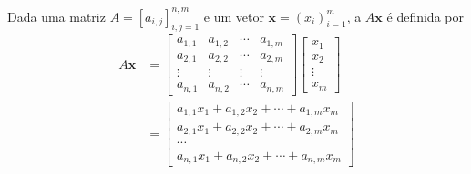 Dada uma matriz $A = [a_{i,j}]_{i,j=1}^{n,m}$ e um vetor $\pmb{x} = (x_i)_{i=1}^m$, a  $A\pmb{x}$ é definida por
\begin{subequations}
  \begin{align}
    A\pmb{x} &=\begin{bmatrix}
      a_{1,1} & a_{1,2} & \cdots & a_{1,m}\\
      a_{2,1} & a_{2,2} & \cdots & a_{2,m}\\
      \vdots & \vdots & \vdots & \vdots\\
      a_{n,1} & a_{n,2} & \cdots & a_{n,m}
    \end{bmatrix}\begin{bmatrix}
      x_1\\
      x_2\\
      \vdots\\
      x_m
    \end{bmatrix}\\
    &=
      \begin{bmatrix}
        a_{1,1}x_1 + a_{1,2}x_2 + \cdots + a_{1,m}x_m\\
        a_{2,1}x_1 + a_{2,2}x_2 + \cdots + a_{2,m}x_m\\
        \cdots\\
        a_{n,1}x_1 + a_{n,2}x_2 + \cdots + a_{n,m}x_m
      \end{bmatrix}
  \end{align}
\end{subequations}


